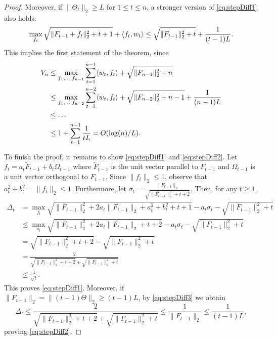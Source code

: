 \begin{proof}
Moreover, if $\|\Theta_t\|_2 \ge L$ for $1\le t\le n$, a stronger version of \eqref{eq:stepDiff1} also holds:
\begin{equation}
\label{eq:stepDiff2}
\max_{f_t} \sqrt{\|F_{t-1} + f_t\|_2^2 + t + 1} + \langle f_t, w_t\rangle \le  \sqrt{\|F_{t-1}\|_2^2 + t} + \frac{1}{(t-1)L}.
\end{equation}
This implies the first statement of the theorem, since
\begin{align*}
V_n & \le \max_{f_1,\ldots, f_{n-1}} \sum_{t=1}^{n-1}\langle w_t, f_t\rangle + \sqrt{\|F_{n-1}\|_2^2 + n} \\
& \le \max_{f_1,\ldots, f_{n-2}} \sum_{t=1}^{n-2}\langle w_t, f_t\rangle  + \sqrt{\|F_{n-2}\|_2^2 + n-1} + \frac{1}{(n-1)L} \\
& \le \ldots \\
& \le 1+ \sum_{t=1}^{n-1}\frac{1}{tL} = O(\log(n)/L).
\end{align*}

To finish the proof, it remains to show \eqref{eq:stepDiff1} and \eqref{eq:stepDiff2}.
Let  $f_t = a_t \tilde{F}_{t-1} + b_t \Omega_{t-1}$ where $\tilde{F}_{t-1}$ is the unit vector parallel to $F_{t-1}$ and $\Omega_{t-1}$ is a unit vector orthogonal to $F_{t-1}$. Since $\|f_t\|_2 \le 1$, observe that $a_t^2+b_t^2 =\|f_t\|_2 \le 1$. Furthermore, let $\sigma_t = \frac{\|F_{t-1}\|_2}{\sqrt{\|F_{t-1}\|_2^2 + t+2}}$.
Then, for any $t \ge 1$,
	\begin{align}
	\Delta_t & =\max_{f_t} \sqrt{\|F_{t-1}\|_2^2 + 2a_t\|F_{t-1}\|_2 + a_t^2 + b_t^2 + t+1} - a_t\sigma_t  - \sqrt{\|F_{t-1}\|_2^2 + t}  \nonumber\\
	& \le \max_{a_t} \sqrt{\|F_{t-1}\|_2^2 + 2a_t\|F_{t-1}\|_2 + t+2} - a_t\sigma_t  - \sqrt{\|F_{t-1}\|_2^2 + t}  \nonumber\\
	& = \sqrt{\|F_{t-1}\|_2^2 + t+2} - \sqrt{\|F_{t-1}\|_2^2 + t}  \nonumber\\
	& = \frac{2}{\sqrt{\|F_{t-1}\|_2^2 + t+2} + \sqrt{\|F_{t-1}\|_2^2 + t}} \label{eq:stepDiff3} \\
	& \le \frac{1}{\sqrt{t}}. \nonumber
	\end{align}
	This proves \eqref{eq:stepDiff1}.
	Moreover, if $\|F_{t-1}\|_2 = \|(t-1)\Theta\|_2 \ge (t-1)L$, by \eqref{eq:stepDiff3} we obtain
	\[
	\Delta_t \le \frac{2}{\sqrt{\|F_{t-1}\|_2^2 + t+2} + \sqrt{\|F_{t-1}\|_2^2 + t}} \le \frac{1}{\|F_{t-1}\|_2}\le \frac{1}{(t-1)L},
	\]
	proving \eqref{eq:stepDiff2}.
\end{proof}


